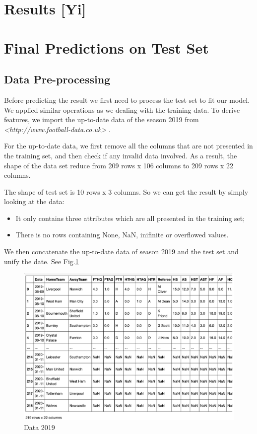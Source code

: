\documentclass{article}
\begin{document}
\section{Results [Yi]}



\section{Final Predictions on Test Set}
\subsection{Data Pre-processing}

Before predicting the result we first need to process the test set to fit our model. We applied similar operations as we dealing with the training data. To derive features, we import the up-to-date data of the season 2019 from {\em<http://www.football-data.co.uk>} .

For the up-to-date data, we first remove all the columns that are not presented in the training set, and then check if any invalid data involved.  As a result, the shape of the data set reduce from 209 rows x 106 columns to 209 rows x 22 columns.

The shape of test set is 10 rows x 3 columns. So we can get the result by simply looking at the data:
\begin{itemize}
\item It only contains three attributes which are all presented in the training set;
\item There is no rows containing None, NaN, inifinite or overflowed values.
\end{itemize}

We then concatenate the up-to-date data of season 2019 and the test set and unify the date. See Fig.\ref{fig:rawData2019}
\begin{figure}[ht]
\centering
\includegraphics[scale=0.45]{graphs/rawData2019.png}
\caption{Data 2019}
\label{fig:rawData2019}
\end{figure}
\end{document}
